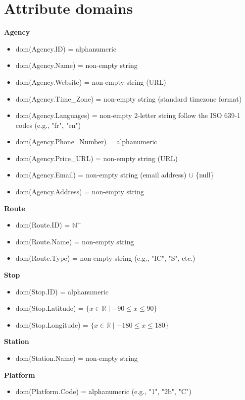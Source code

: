 \documentclass[a4paper, 12pt]{article}
\begin{document}
\section{Attribute domains} \label{sec:2}
\textbf{Agency}
\begin{itemize}
    \item dom(Agency.ID) = alphanumeric
    \item dom(Agency.Name) = non-empty string
    \item dom(Agency.Website) = non-empty string (URL)
    \item dom(Agency.Time\_Zone) = non-empty string (standard timezone format)
    \item dom(Agency.Languages) = non-empty 2-letter string follow the ISO 639-1 codes (e.g., "fr", "en")
    \item dom(Agency.Phone\_Number) = alphanumeric
    \item dom(Agency.Price\_URL) = non-empty string (URL)
    \item dom(Agency.Email) = non-empty string (email address) $\cup$ \{null\}
    \item dom(Agency.Address) = non-empty string
\end{itemize}

\textbf{Route}
\begin{itemize}
    \item dom(Route.ID) = $\mathbb{N}^+$
    \item dom(Route.Name) = non-empty string
    \item dom(Route.Type) = non-empty string (e.g., "IC", "S", etc.)
\end{itemize}

\textbf{Stop}
\begin{itemize}
    \item dom(Stop.ID) = alphanumeric
    \item dom(Stop.Latitude) = $\{x \in \mathbb{R} \mid -90 \leq x \leq 90\}$ %
    \item dom(Stop.Longitude) = $\{x \in \mathbb{R} \mid -180 \leq x \leq 180\}$ %
\end{itemize}

\textbf{Station}
\begin{itemize}
    \item dom(Station.Name) = non-empty string
\end{itemize}

\textbf{Platform}
\begin{itemize}
    \item dom(Platform.Code) = alphanumeric (e.g., "1", "2b", "C")
\end{itemize}
\end{document}
